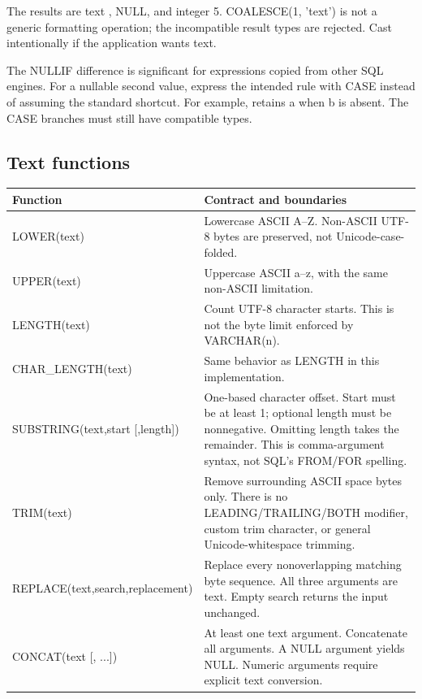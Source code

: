 The results are text , NULL, and integer 5. COALESCE(1, 'text') is not a generic formatting operation; the incompatible result types are rejected. Cast intentionally if the application wants text.

The NULLIF difference is significant for expressions copied from other SQL engines. For a nullable second value, express the intended rule with CASE instead of assuming the standard shortcut. For example,  retains a when b is absent. The CASE branches must still have compatible types.

\subsection{Text functions}

\begin{longtable}{p{.30\linewidth}p{.63\linewidth}}
\toprule
Function & Contract and boundaries \\
\midrule
\endhead
LOWER(text) & Lowercase ASCII A--Z. Non-ASCII UTF-8 bytes are preserved, not Unicode-case-folded. \\
UPPER(text) & Uppercase ASCII a--z, with the same non-ASCII limitation. \\
LENGTH(text) & Count UTF-8 character starts. This is not the byte limit enforced by VARCHAR(n). \\
CHAR\_LENGTH(text) & Same behavior as LENGTH in this implementation. \\
SUBSTRING(text,start [,length]) & One-based character offset. Start must be at least 1; optional length must be nonnegative. Omitting length takes the remainder. This is comma-argument syntax, not SQL's FROM/FOR spelling. \\
TRIM(text) & Remove surrounding ASCII space bytes only. There is no LEADING/TRAILING/BOTH modifier, custom trim character, or general Unicode-whitespace trimming. \\
REPLACE(text,\allowbreak search,\allowbreak replacement) & Replace every nonoverlapping matching byte sequence. All three arguments are text. Empty search returns the input unchanged. \\
CONCAT(text [, ...]) & At least one text argument. Concatenate all arguments. A NULL argument yields NULL. Numeric arguments require explicit text conversion. \\
\bottomrule
\end{longtable}

